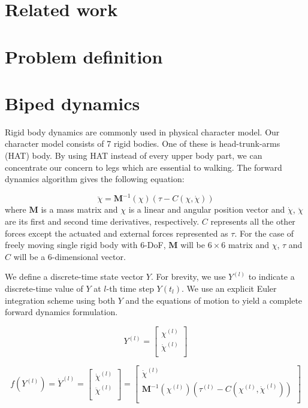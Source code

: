 \documentclass[a4paper,10pt]{article}
\begin{document}
\section{Related work}

\section{Problem definition}

\section{Biped dynamics}

Rigid body dynamics are commonly used in physical character model.
Our character model consists of 7 rigid bodies. One of these is
head-trunk-arms (HAT) body. By using HAT instead of every upper body
part, we can concentrate our concern to legs which are essential to
walking. The forward dynamics algorithm gives the following equation:


\begin{equation}
\ddot\chi =\mathbf{M}^{-1}(\chi) ( \tau - C(\chi,\dot\chi) )
\end{equation}
where $\mathbf{M}$ is a mass matrix and $\chi$ is a linear and angular position
vector and $\dot\chi$, $\ddot\chi$ are its first and second time derivatives,
respectively. $C$ represents all the other forces except the actuated and
external forces represented as $\tau$. For the case of freely moving single
rigid body with 6-DoF, $\mathbf{M}$ will be $6\times 6$ matrix and $\chi$,
$\tau$ and $C$ will be a 6-dimensional vector.

We define a discrete-time state vector $Y$. For brevity, we use $Y^{(l)}$
to indicate a discrete-time value of $Y$ at $l$-th time step $Y(t_l)$.
We use an explicit Euler integration
scheme using both $Y$ and the equations of motion to yield a complete
forward dynamics formulation.


\begin{equation}
Y^{(l)} =
\left[ {\begin{array}{cc}
 \chi^{(l)}   \\
 \dot\chi^{(l)}   \\
 \end{array} } \right]
\end{equation}


\begin{equation}
f(Y^{(l)})=\dot{Y}^{(l)}
=
\left[ {\begin{array}{cc}
 \dot\chi^{(l)}   \\
 \ddot\chi^{(l)}   \\
 \end{array} } \right]
 =
\left[ {\begin{array}{cc}
 \dot\chi^{(l)}   \\
 \mathbf{M}^{-1}(\chi^{(l)}) ( \tau^{(l)} - C(\chi^{(l)},\dot\chi^{(l)}) )   \\
 \end{array} } \right]
\end{equation}
\end{document}

